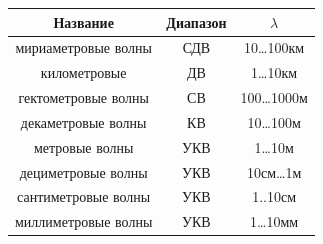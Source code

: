 \begin{table}[H]
	\centering
	\begin{tabular}{|c|c|c|}
		\hline
		Название & Диапазон & $\lambda$ \\ \hline
		мириаметровые волны & СДВ &10…100км \\ \hline
		километровые  & ДВ & 1…10км \\ \hline
		гектометровые волны & СВ &100…1000м \\ \hline
		декаметровые  волны & КВ & 10…100м \\ \hline
		метровые  волны & УКВ & 1…10м \\ \hline
		дециметровые  волны & УКВ & 10см…1м \\ \hline
		сантиметровые  волны & УКВ & 1..10см \\ \hline
		миллиметровые   волны & УКВ & 1…10мм \\ \hline
	\end{tabular}
	\end{table}



